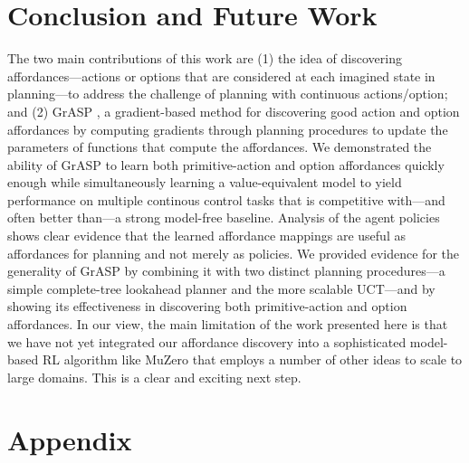 \documentclass[nohyperref]{article}
\theoremstyle{plain}
\theoremstyle{definition}
\theoremstyle{remark}
\newcommand{\grasp}{{G}r{ASP} }
\newcommand{\cutsectiondown}{\vspace*{-0.03in}}
\begin{document}
\section{Conclusion and Future Work}
The two main contributions of this work are (1) the idea of discovering affordances---actions or options that are {considered} at each imagined state in planning---to address the challenge of planning with continuous actions/option; and (2) \grasp, a gradient-based method for discovering good action and option affordances by computing gradients through planning procedures to update the parameters of functions that compute the affordances. 
We demonstrated the ability of \grasp to learn both primitive-action and option affordances quickly enough while simultaneously learning a value-equivalent model to yield performance on multiple continous control tasks that is competitive with---and often better than---a strong model-free baseline. Analysis of the agent policies shows clear evidence that the learned affordance mappings are useful as affordances for planning  and not merely as policies. We provided evidence for the generality of \grasp  by combining it with two distinct planning procedures---a simple complete-tree lookahead planner and the more scalable UCT---and by showing its effectiveness in discovering  both primitive-action and option affordances. In our view, the main limitation of the work presented here is that we have not yet integrated our affordance discovery into a sophisticated model-based RL algorithm like MuZero that employs a number of other ideas to scale to large domains. This is a clear and exciting next step.






\newpage
\appendix
\onecolumn

\section{Appendix}
\end{document}
